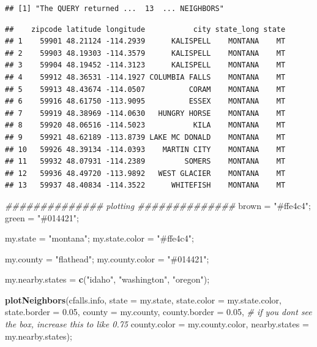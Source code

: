 \documentclass[
]{article}
\newenvironment{Shaded}{\begin{snugshade}}{\end{snugshade}}
\newcommand{\CommentTok}[1]{\textcolor[rgb]{0.56,0.35,0.01}{\textit{#1}}}
\newcommand{\DataTypeTok}[1]{\textcolor[rgb]{0.13,0.29,0.53}{#1}}
\newcommand{\FloatTok}[1]{\textcolor[rgb]{0.00,0.00,0.81}{#1}}
\newcommand{\KeywordTok}[1]{\textcolor[rgb]{0.13,0.29,0.53}{\textbf{#1}}}
\newcommand{\NormalTok}[1]{#1}
\newcommand{\OperatorTok}[1]{\textcolor[rgb]{0.81,0.36,0.00}{\textbf{#1}}}
\newcommand{\StringTok}[1]{\textcolor[rgb]{0.31,0.60,0.02}{#1}}
\begin{document}
\begin{verbatim}
## [1] "The QUERY returned ...  13  ... NEIGHBORS"
\end{verbatim}

\begin{Shaded}
\end{Shaded}

\begin{verbatim}
##    zipcode latitude longitude           city state_long state
## 1    59901 48.21124 -114.2939      KALISPELL    MONTANA    MT
## 2    59903 48.19303 -114.3579      KALISPELL    MONTANA    MT
## 3    59904 48.19452 -114.3123      KALISPELL    MONTANA    MT
## 4    59912 48.36531 -114.1927 COLUMBIA FALLS    MONTANA    MT
## 5    59913 48.43674 -114.0507          CORAM    MONTANA    MT
## 6    59916 48.61750 -113.9095          ESSEX    MONTANA    MT
## 7    59919 48.38969 -114.0630   HUNGRY HORSE    MONTANA    MT
## 8    59920 48.06516 -114.5023           KILA    MONTANA    MT
## 9    59921 48.62189 -113.8739 LAKE MC DONALD    MONTANA    MT
## 10   59926 48.39134 -114.0393    MARTIN CITY    MONTANA    MT
## 11   59932 48.07931 -114.2389         SOMERS    MONTANA    MT
## 12   59936 48.49720 -113.9892   WEST GLACIER    MONTANA    MT
## 13   59937 48.40834 -114.3522      WHITEFISH    MONTANA    MT
\end{verbatim}

\begin{Shaded}
\begin{Highlighting}[]
\CommentTok{\#\#\#\#\#\#\#\#\#\#\#\#\#\# plotting \#\#\#\#\#\#\#\#\#\#\#\#\#\#}
\NormalTok{brown =}\StringTok{ "\#ffe4c4"}\NormalTok{;}
\NormalTok{green =}\StringTok{ "\#014421"}\NormalTok{;}

\NormalTok{my.state =}\StringTok{ "montana"}\NormalTok{;}
\NormalTok{my.state.color =}\StringTok{ "\#ffe4c4"}\NormalTok{;}

\NormalTok{my.county =}\StringTok{ "flathead"}\NormalTok{;}
\NormalTok{my.county.color =}\StringTok{ "\#014421"}\NormalTok{; }

\NormalTok{my.nearby.states =}\StringTok{ }\KeywordTok{c}\NormalTok{(}\StringTok{"idaho"}\NormalTok{, }\StringTok{"washington"}\NormalTok{, }\StringTok{"oregon"}\NormalTok{);}


\KeywordTok{plotNeighbors}\NormalTok{(cfalls.info, }
                    \DataTypeTok{state          =}\NormalTok{ my.state, }
                    \DataTypeTok{state.color    =}\NormalTok{ my.state.color,}
                    \DataTypeTok{state.border   =} \FloatTok{0.05}\NormalTok{,}
                    \DataTypeTok{county         =}\NormalTok{ my.county, }
                    \DataTypeTok{county.border   =} \FloatTok{0.05}\NormalTok{,  }\CommentTok{\# if you don\textquotesingle{}t see the box, increase this to like 0.75}
                    \DataTypeTok{county.color   =}\NormalTok{ my.county.color, }
                    \DataTypeTok{nearby.states  =}\NormalTok{ my.nearby.states); }
\end{Highlighting}
\end{Shaded}
\end{document}
